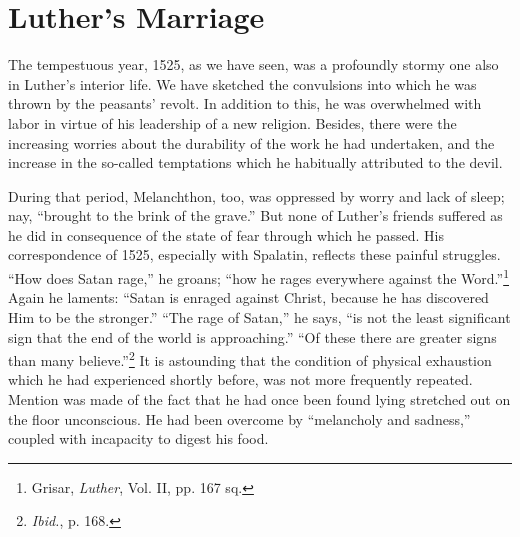 \section{Luther’s Marriage}

The tempestuous year, 1525, as we have seen, was a profoundly
stormy one also in Luther’s interior life. We have sketched the convulsions
into which he was thrown by the peasants’ revolt. In addition to this,
he was overwhelmed with labor in virtue of his leadership of a new religion.
Besides, there were the increasing worries
about the durability of the work he had undertaken, and the increase
in the so-called temptations which he habitually attributed to the
devil.

During that period, Melanchthon, too, was oppressed by worry
and lack of sleep; nay, “brought to the brink of the grave.” But
none of Luther’s friends suffered as he did in consequence of the
state of fear through which he passed. His correspondence of 1525,
especially with Spalatin, reflects these painful struggles. “How does
Satan rage,” he groans; “how he rages everywhere against the
Word.”\footnote{Grisar, \textit{Luther}, Vol. II, pp. 167 sq.}
Again he laments: “Satan is enraged against Christ, because
he has discovered Him to be the stronger.” “The rage of Satan,”
he says, “is not the least significant sign that the end of the world is
approaching.” “Of these there are greater signs than many believe.”\footnote{\textit{Ibid.}, p. 168.}
It is astounding that the condition of physical exhaustion which he
had experienced shortly before, was not more frequently repeated.
Mention was made of the fact that he had once been found lying
stretched out on the floor unconscious. He had been overcome by
“melancholy and sadness,” coupled with incapacity to digest his food.

